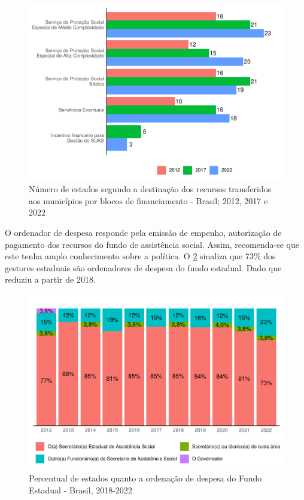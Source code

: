 \documentclass[
  brazilian]{report}
\begin{document}
\begin{figure}
\includegraphics{Censo-SUAS-2022_files/figure-latex/estados-blocos-recursos-1} \caption[Número de estados segundo a destinação dos recursos transferidos aos municípios por blocos de financiamento - Brasil]{Número de estados segundo a destinação dos recursos transferidos aos municípios por blocos de financiamento - Brasil; 2012, 2017 e 2022}\label{fig:estados-blocos-recursos}
\end{figure}

O ordenador de despesa responde pela emissão de empenho, autorização de
pagamento dos recursos do fundo de assistência social. Assim,
recomenda-se que este tenha amplo conhecimento sobre a política. O
\cref{fig:estado_ord_despesa} sinaliza que 73\% dos gestores estaduais
são ordenadores de despesa do fundo estadual. Dado que reduziu a partir
de 2018.

\begin{figure}
\includegraphics{Censo-SUAS-2022_files/figure-latex/estado_ord_despesa-1} \caption[Percentual de estados quanto a ordenação de despesa do Fundo Estadual - Brasil, 2018-2022]{Percentual de estados quanto a ordenação de despesa do Fundo Estadual - Brasil, 2018-2022}\label{fig:estado_ord_despesa}
\end{figure}
\end{document}
